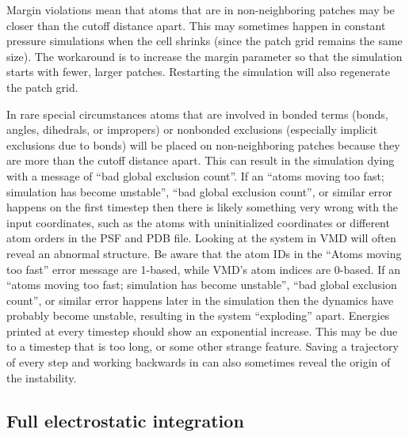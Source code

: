 Margin violations mean that atoms that are in non-neighboring patches may
be closer than the cutoff distance apart.  This may sometimes happen in
constant pressure simulations when the cell shrinks (since the patch grid
remains the same size).  The workaround is to increase the margin
parameter so that the simulation starts with fewer, larger patches.
Restarting the simulation will also regenerate the patch grid.

In rare special circumstances atoms that are involved in bonded terms
(bonds, angles, dihedrals, or impropers) or nonbonded exclusions (especially
implicit exclusions due to bonds) will be placed on non-neighboring
patches because they are more than the cutoff distance apart.  This can
result in the simulation dying with a message of
``bad global exclusion count''.
If an ``atoms moving too fast; simulation has become unstable'',
``bad global exclusion count'', or similar error happens
on the first timestep then there is likely something very
wrong with the input coordinates, such as the atoms with uninitialized
coordinates or different atom orders in the PSF and PDB file.  Looking at
the system in VMD will often reveal an abnormal structure.
Be aware that the atom IDs in the ``Atoms moving too fast'' error
message are 1-based, while VMD's atom indices are 0-based.
If an ``atoms moving too fast; simulation has become unstable'',
``bad global exclusion count'', or similar error happens
later in the simulation then the dynamics have
probably become unstable, resulting in the system ``exploding'' apart.
Energies printed at every timestep should show an exponential increase.
This may be due to a timestep that is too long, or some other strange
feature.  Saving a trajectory of every step and working backwards in
can also sometimes reveal the origin of the instability.

\subsection{Full electrostatic integration}
\label{section:fmadesc}

